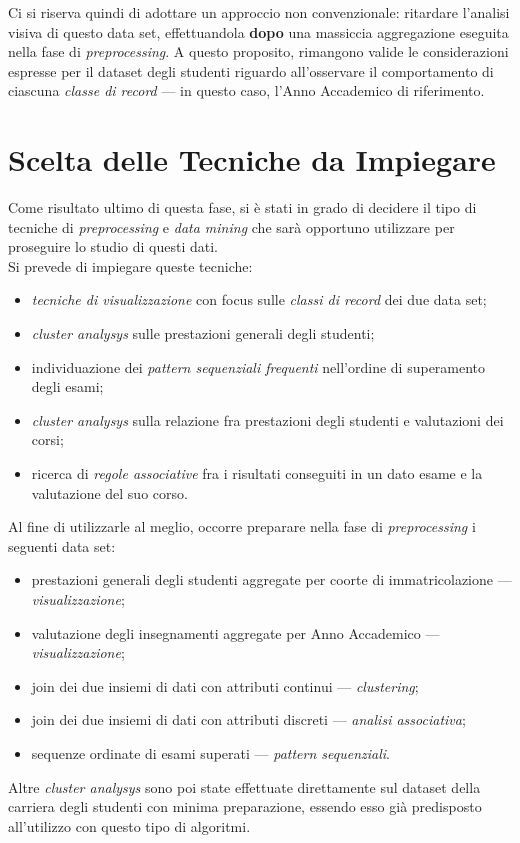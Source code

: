         Ci si riserva quindi di adottare un approccio non convenzionale: ritardare l'analisi visiva di questo data set, effettuandola \textbf{dopo} una massiccia aggregazione eseguita nella fase di \textit{preprocessing}. A questo proposito, rimangono valide le considerazioni espresse per il dataset degli studenti riguardo all'osservare il comportamento di ciascuna \textit{classe di record} --- in questo caso, l'Anno Accademico di riferimento.

    \section{Scelta delle Tecniche da Impiegare}

        Come risultato ultimo di questa fase, si è stati in grado di decidere il tipo di tecniche di \textit{preprocessing} e \textit{data mining} che sarà opportuno utilizzare per proseguire lo studio di questi dati. \\

        Si prevede di impiegare queste tecniche:

        \begin{itemize}
            \item \textit{tecniche di visualizzazione} con focus sulle \textit{classi di record} dei due data set;
            \item \textit{cluster analysys} sulle prestazioni generali degli studenti;
            \item individuazione dei \textit{pattern sequenziali frequenti} nell'ordine di superamento degli esami;
            \item \textit{cluster analysys} sulla relazione fra prestazioni degli studenti e valutazioni dei corsi;
            \item ricerca di \textit{regole associative} fra i risultati conseguiti in un dato esame e la valutazione del suo corso.
        \end{itemize}

        Al fine di utilizzarle al meglio, occorre preparare nella fase di \textit{preprocessing} i seguenti data set:

        \begin{itemize}
            \item prestazioni generali degli studenti aggregate per coorte di immatricolazione --- \textit{visualizzazione};
            \item valutazione degli insegnamenti aggregate per Anno Accademico --- \textit{visualizzazione};
            \item join dei due insiemi di dati con attributi continui --- \textit{clustering};
            \item join dei due insiemi di dati con attributi discreti --- \textit{analisi associativa};
            \item sequenze ordinate di esami superati --- \textit{pattern sequenziali}.
        \end{itemize}

        Altre \textit{cluster analysys} sono poi state effettuate direttamente sul dataset della carriera degli studenti con minima preparazione, essendo esso già predisposto all'utilizzo con questo tipo di algoritmi.
